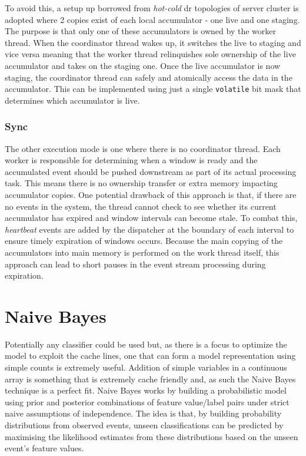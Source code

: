 \documentclass[a4paper,11pt]{scrreprt}
\begin{document}
To avoid this, a setup up borrowed from \textit{hot-cold} \acrshort{dr} topologies of server cluster is adopted where 2 copies exist of each local accumulator - one live and one staging. The purpose is that only one of these accumulators is owned by the worker thread. When the coordinator thread wakes up, it switches the live to staging and vice versa meaning that the worker thread relinquishes sole ownership of the live accumulator and takes on the staging one. Once the live accumulator is now staging, the coordinator thread can safely and atomically access the data in the accumulator. This can be implemented using just a single \texttt{volatile} bit mask that determines which accumulator is live. 
\subsubsection{Sync}
The other execution mode is one where there is no coordinator thread. Each worker is responsible for determining when a window is ready and the accumulated event should be pushed downstream as part of its actual processing task. This means there is no ownership transfer or extra memory impacting accumulator copies. One potential drawback of this approach is that, if there are no events in the system, the thread cannot check to see whether its current accumulator has expired and window intervals can become stale. To combat this, \textit{heartbeat} events are added by the dispatcher at the boundary of each interval to ensure timely expiration of windows occurs. Because the main copying of the accumulators into main memory is performed on the work thread itself, this approach can lead to short pauses in the event stream processing during expiration.
\section{Naive Bayes}
Potentially any classifier could be used but, as there is a focus to optimize the model to exploit the cache lines, one that can form a model representation using simple counts is extremely useful. Addition of simple variables in a continuous array is something that is extremely cache friendly and, as such the Naive Bayes technique is a perfect fit. Naive Bayes works by building a probabilistic model using prior and posterior combinations of feature value/label pairs under strict naive assumptions of independence. The idea is that, by building probability distributions from observed events, unseen classifications can be predicted by maximising the likelihood estimates from these distributions based on the unseen event's feature values. 
\end{document}
